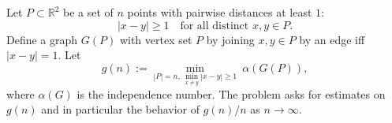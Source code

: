 Let $P\subset\mathbb{R}^2$ be a set of $n$ points with pairwise distances at least $1$:
\[
|x-y|\ge 1\quad\text{for all distinct }x,y\in P.
\]
Define a graph $G(P)$ with vertex set $P$ by joining $x,y\in P$ by an edge iff $|x-y|=1$.
Let
\[
 g(n) := \min_{|P|=n,\ \min_{x\ne y}|x-y|\ge 1}\ \alpha(G(P)),
\]
where $\alpha(G)$ is the independence number.
The problem asks for estimates on $g(n)$ and in particular the behavior of $g(n)/n$ as $n\to\infty$.

